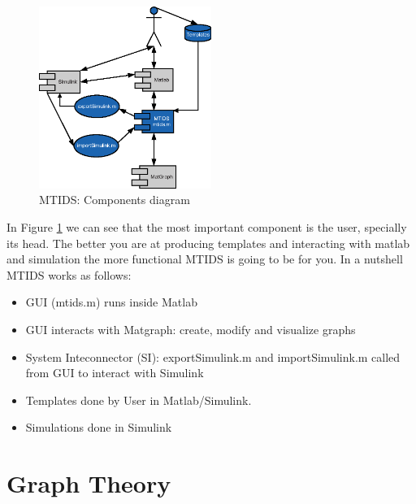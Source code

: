 \documentclass[a4paper,twoside, openright,12pt]{report}
\begin{document}
\begin{figure}[htb]
\centering
\includegraphics[width=0.5\textwidth]{pics/uml.eps}
\caption[MTIDS components]{MTIDS: Components diagram}
\label{componentsFig}
\end{figure}

In Figure \ref{componentsFig} we can see that the most important component is the user, specially its head. The better you are at producing templates
and interacting with matlab and simulation the more functional MTIDS is going to be for you.
In a nutshell MTIDS works as follows:
\begin{itemize}
\item GUI (mtids.m) runs inside Matlab
\item GUI interacts with Matgraph: create, modify and visualize graphs  
\item System Inteconnector (SI): exportSimulink.m and importSimulink.m called from GUI to interact with Simulink
\item Templates done by User in Matlab/Simulink.
\item Simulations done in Simulink
\end{itemize}
%  
% 

\chapter{Graph Theory}\label{chapter2}
\end{document}
